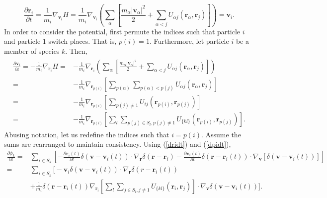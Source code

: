 \documentclass{article}
\begin{document}
\begin{equation}
\frac{\partial \mathbf{r}_i}{\partial t}=\frac{1}{m_i}\nabla_{\mathbf{v}_i}H=\frac{1}{m_i}\nabla_{\mathbf{v}_i}\left(\sum_\alpha\left[\frac{m_\alpha|\mathbf{v}_\alpha|^2}{2}+\sum_{\alpha<j}U_{\alpha j}(\mathbf{r}_\alpha,\mathbf{r}_j)\right]\right)=\mathbf{v}_i.\label{dridt}
\end{equation}In order to consider the potential, first permute the indices such that particle $i$ and particle $1$ switch places. That is, $p(i)=1$. Furthermore, let particle $i$ be a member of species $k$. Then,
\begin{align}
\begin{split}
\frac{\partial \mathbf{v}_i}{\partial t}=-\frac{1}{m_i}\nabla_{\mathbf{r}_i}H=&-\frac{1}{m_i}\nabla_{\mathbf{r}_i}\left(\sum_\alpha\left[\frac{m_\alpha|\mathbf{v}_\alpha|^2}{2}+\sum_{\alpha<j}U_{\alpha j}(\mathbf{r}_\alpha,\mathbf{r}_j)\right]\right)
\\=&-\frac{1}{m_i}\nabla_{\mathbf{r}_{p(i)}} \left[\sum_{p(\alpha)}\sum_{p(\alpha)<p(j)}U_{\alpha j}(\mathbf{r}_\alpha,\mathbf{r}_j)\right]\\
=&-\frac{1}{m_i}\nabla_{\mathbf{r}_{p(i)}}\left[\sum_{p(j)\neq 1}U_{ij}(\mathbf{r}_{p(i)},\mathbf{r}_{p(j)})\right]\\
=&-\frac{1}{m_i}\nabla_{\mathbf{r}_{p(i)}}\left[\sum_l\sum_{p(j)\in S_l,p(j)\neq 1}U_{\{kl\}}(\mathbf{r}_{p(i)},\mathbf{r}_{p(j)})\right].\label{dpidt}
\end{split}\end{align}Abusing notation, let us redefine the indices such that $i=p(i)$. Assume the sums are rearranged to maintain consistency. Using (\ref{dridt}) and (\ref{dpidt}),
\begin{align*}
\frac{\partial \phi_k}{\partial t}=&\sum_{i\in S_k}\left[-\frac{\partial \mathbf{r}_i(t)}{\partial t}\delta(\mathbf{v}-\mathbf{v}_i(t))\cdot \nabla_\mathbf{r}\delta(\mathbf{r}-\mathbf{r}_i)-\frac{\partial \mathbf{v}_i(t)}{\partial t}\delta(\mathbf{r}-\mathbf{r}_i(t))\cdot \nabla_\mathbf{v}[\delta(\mathbf{v}-\mathbf{v}_i(t))]\right]\\
=&\sum_{i\in S_k}\bigg[-\mathbf{v}_i\delta(\mathbf{v}-\mathbf{v}_i(t))\cdot\nabla_\mathbf{r}\delta(r-\mathbf{r}_i(t))\\&+\frac{1}{m_i}\delta(\mathbf{r}-\mathbf{r}_i(t))\nabla_{\mathbf{r}_i}\left[\sum_l\sum_{j\in S_l,j\neq 1}U_{\{kl\}}(\mathbf{r}_{i},\mathbf{r}_{j})\right]\cdot \nabla_\mathbf{v}\delta(\mathbf{v}-\mathbf{v}_i(t))\bigg].
\end{align*}
\end{document}
